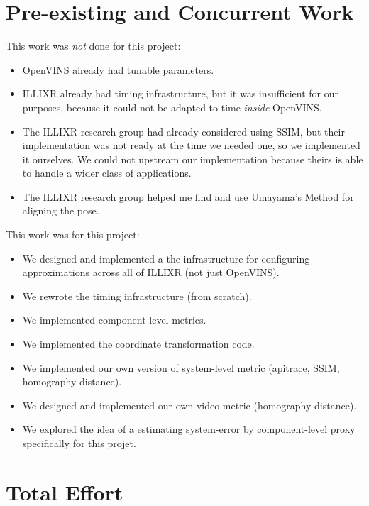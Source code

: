 \documentclass[sigconf,screen]{acmart}
\begin{document}



\appendix
\section{Pre-existing and Concurrent Work}
This work was \textit{not} done for this project:

\begin{itemize}
\item OpenVINS already had tunable parameters.
\item ILLIXR already had timing infrastructure, but it was insufficient for our purposes, because it could not be adapted to time \textit{inside} OpenVINS.
\item The ILLIXR research group had already considered using SSIM, but their implementation was not ready at the time we needed one, so we implemented it ourselves. We could not upstream our implementation because theirs is able to handle a wider class of applications.
\item The ILLIXR research group helped me find and use Umayama's Method for aligning the pose.
\end{itemize}

This work was for this project:

\begin{itemize}
\item We designed and implemented a the infrastructure for configuring approximations across all of ILLIXR (not just OpenVINS).
\item We rewrote the timing infrastructure (from scratch).
\item We implemented component-level metrics.
\item We implemented the coordinate transformation code.
\item We implemented our own version of system-level metric (apitrace, SSIM, homography-distance).
\item We designed and implemented our own video metric (homography-distance).
\item We explored the idea of a estimating system-error by component-level proxy specifically for this projet.
\end{itemize}

\section{Total Effort}
\end{document}
